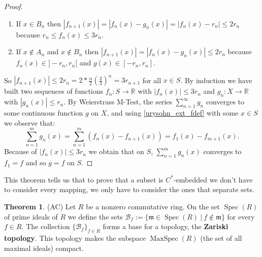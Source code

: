 \documentclass[a4paper]{book}
\theoremstyle{definition}
\newtheorem{theorem}{Theorem}[section]
\theoremstyle{ejemplo}
\theoremstyle{demostracion}
\newcommand{\reales}{\mathbb{R}}
\DeclareMathOperator{\maxspec}{MaxSpec}
\DeclareMathOperator{\spec}{Spec}
\begin{document}
\begin{proof}
\begin{enumerate}
		\item
		If $x \in B_n$ then $|f_{n+1}(x)| = |f_n(x) - g_n(x)| = |f_n(x) - r_n| \leq 2r_n$ because $r_n \leq f_n(x) \leq 3r_n$.	
		
		\item
		If $x \not \in A_n$ and $x \not \in B_n$ then $|f_{n+1}(x)| = |f_n(x) - g_n(x)| \leq 2r_n$ because $f_n(x) \in ]-r_n, r_n[$ and $g(x) \in [-r_n, r_n]$.	
	\end{enumerate}
	So $|f_{n+1}(x)| \leq 2r_n = 2 * \frac{\alpha}{2} (\frac{2}{3})^n = 3r_{n+1}$ for all $x \in S$. By induction we have built two sequences of functions $f_n : S \rightarrow \reales$ with $|f_n(x)| \leq 3r_n$ and $g_n : X \rightarrow \reales$ with $|g_n(x)| \leq r_n$. By Weierstrass M-Test, the series $\sum_{n=1}^{\infty} g_n$ converges to some continuous function $g$ on $X$, and using \eqref{urysohn_ext_fdef} with some $x \in S$ we observe that:
	\begin{equation*}
		\sum_{n=1}^{m} g_n(x) = \sum_{n=1}^{m} (f_n(x) - f_{n+1}(x)) = f_1(x) - f_{m+1}(x).
	\end{equation*}
	Because of $|f_n(x)| \leq 3r_n$ we obtain that on $S$, $\sum_{n=1}^{m} g_n(x)$ converges to $f_1 = f$ and so $g = f$ on $S$.
\end{proof}


This theorem tells us that to prove that a subset is $C^*$-embedded we don't have to consider every mapping, we only have to consider the ones that separate sets. \\ 



\begin{theorem}\label{thm:def_zariski_topology}
	(AC) Let $R$ be a nonzero commutative ring. On the set $\spec(R)$ of prime ideals of $R$ we define the sets $\mathcal{B}_f := \{\mathfrak{m} \in \spec(R)\ |\ f \not \in \mathfrak{m} \}$ for every $f \in R$. The collection $\{ \mathcal{B}_f\}_{f \in R}$ forms a base for a topology, the \textbf{Zariski topology}. This topology makes the subspace $\maxspec(R)$ (the set of all maximal ideals) compact.
\end{theorem}
\end{document}
